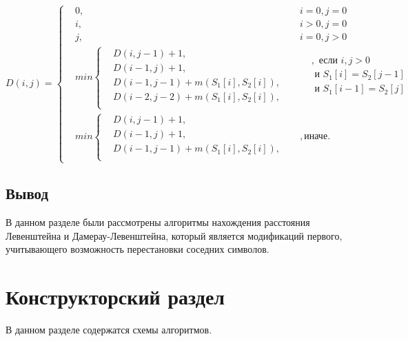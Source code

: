 \documentclass[a4paper,12pt]{article}
\begin{document}
		     \[ D(i, j) =  \left\{
			\begin{aligned}
				&0, && i = 0, j = 0\\
		    	&i, && i > 0, j = 0\\
		    	&j, && i = 0, j > 0\\		    	
		    	&min \left\{
				\begin{aligned}
					&D(i, j - 1) + 1,\\
		            &D(i - 1, j) + 1,\\
		            &D(i - 1, j - 1) + m(S_{1}[i], S_{2}[i]), \\
		            &D(i - 2, j - 2) + m(S_{1}[i], S_{2}[i]),\\
		        \end{aligned} \right.
		        && 
				\begin{aligned}
					&, \text{ если } i, j > 0 \\
		            & \text{ и } S_{1}[i] = S_{2}[j - 1] \\
		            & \text{ и } S_{1}[i - 1] =  S_{2}[j] \\
		        \end{aligned} \\ 
		        &min \left\{
		        \begin{aligned}
		            &D(i, j - 1) + 1,\\
		            &D(i - 1, j) + 1, \\
		            &D(i - 1, j - 1) + m(S_{1}[i], S_{2}[i]),\\
		        \end{aligned} \right.  &&, \text{иначе}.
			\end{aligned} \right.
			\]	
	    
		\subsection*{Вывод}
		В данном разделе были рассмотрены алгоритмы нахождения расстояния Левенштейна и Дамерау-Левенштейна, который является модификаций первого, учитывающего возможность перестановки соседних символов. 


\pagebreak


\section{Конструкторский раздел}
	В данном разделе содержатся схемы алгоритмов.
	
       
\end{document}
